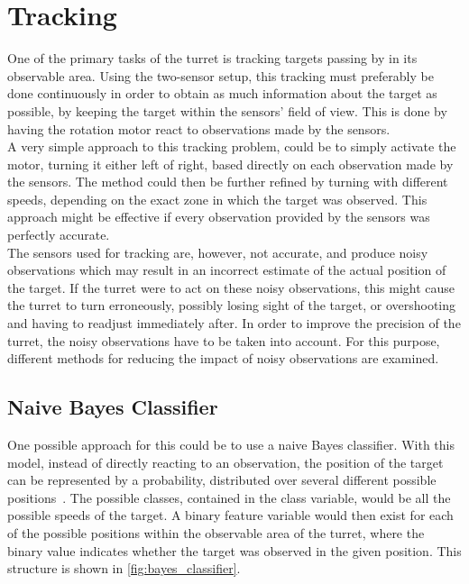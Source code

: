 \section{Tracking}\label{sec:design_tracking}
One of the primary tasks of the turret is tracking targets passing by in its observable area. Using the two-sensor setup, this tracking must preferably be done continuously in order to obtain as much information about the target as possible, by keeping the target within the sensors' field of view. This is done by having the rotation motor react to observations made by the sensors. \\

A very simple approach to this tracking problem, could be to simply activate the motor, turning it either left of right, based directly on each observation made by the sensors. The method could then be further refined by turning with different speeds, depending on the exact zone in which the target was observed. This approach might be effective if every observation provided by the sensors was perfectly accurate. \\

The sensors used for tracking are, however, not accurate, and produce noisy observations which may result in an incorrect estimate of the actual position of the target. If the turret were to act on these noisy observations, this might cause the turret to turn erroneously, possibly losing sight of the target, or overshooting and having to readjust immediately after. In order to improve the precision of the turret, the noisy observations have to be taken into account. For this purpose, different methods for reducing the impact of noisy observations are examined.

\subsection{Naive Bayes Classifier} \label{ss:naive_bayes}
One possible approach for this could be to use a naive Bayes classifier. With this model, instead of directly reacting to an observation, the position of the target can be represented by a probability, distributed over several different possible positions~\cite{poole2010artificial}. The possible classes, contained in the class variable, would be all the possible speeds of the target. A binary feature variable would then exist for each of the possible positions within the observable area of the turret, where the binary value indicates whether the target was observed in the given position. This structure is shown in \cref{fig:bayes_classifier}. 


